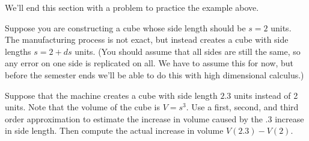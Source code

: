  We'll end this section with a problem to practice the example above.
 
 \begin{problem}
 Suppose you are constructing a cube whose side length should be $s=2$ units. The manufacturing process is not exact, but instead creates a cube with side lengths $s=2+ds$ units. (You should assume that all sides are still the same, so any error on one side is replicated on all.  We have to assume this for now, but before the semester ends we'll be able to do this with high dimensional calculus.) 
 
  Suppose that the machine creates a cube with side length $2.3$ units instead of 2 units.  Note that the volume of the cube is $V=s^3$.  Use a first, second, and third order approximation to estimate the increase in volume caused by the .3 increase in side length.  Then compute the actual increase in volume $V(2.3)-V(2)$.   
 \end{problem}



